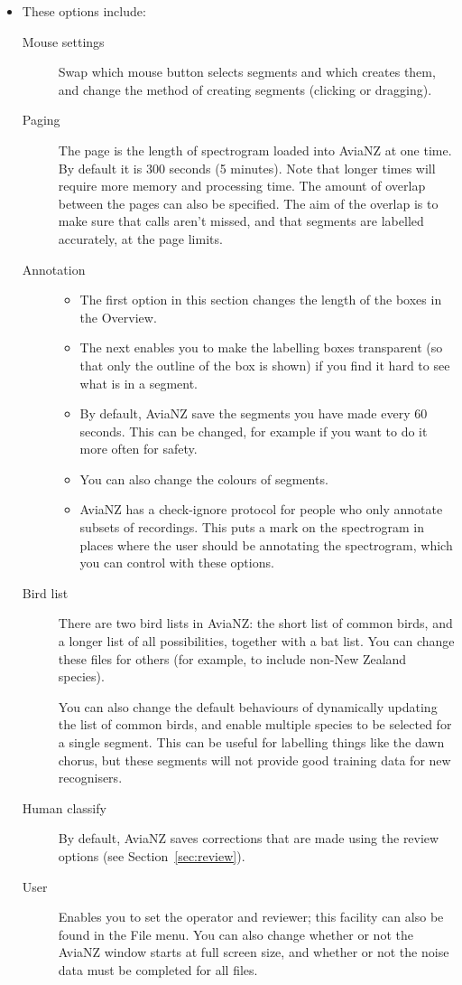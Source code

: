 \documentclass{article}
\begin{document}
\begin{itemize}
\item These options include:
\begin{description}
\item[Mouse settings] Swap which mouse button selects segments and which creates them, and change the method of creating segments (clicking or dragging).
\item[Paging] The page is the length of spectrogram loaded into AviaNZ at one time. By default it is 300 seconds (5 minutes). Note that longer times will require more memory and processing time. The amount of overlap between the pages can also be specified. The aim of the overlap is to make sure that calls aren't missed, and that segments are labelled accurately, at the page limits. 
\item[Annotation] 
\begin{itemize}
\item The first option in this section changes the length of the boxes in the Overview. 
\item The next enables you to make the labelling boxes transparent (so that only the outline of the box is shown) if you find it hard to see what is in a segment. 
\item By default, AviaNZ save the segments you have made every 60 seconds. This can be changed, for example if you want to do it more often for safety. 
\item You can also change the colours of segments.
\item AviaNZ has a check-ignore protocol for people who only annotate subsets of recordings. This puts a mark on the spectrogram in places where the user should be annotating the spectrogram, which you can control with these options.
\end{itemize}
\item[Bird list] There are two bird lists in AviaNZ: the short list of common birds, and a longer list of all possibilities, together with a bat list. You can change these files for others (for example, to include non-New Zealand species). %

You can also change the default behaviours of dynamically updating the list of common birds, and enable multiple species to be selected for a single segment. This can be useful for labelling things like the dawn chorus, but these segments will not provide good training data for new recognisers. 
\item[Human classify] By default, AviaNZ saves corrections that are made using the review options (see Section~\ref{sec:review}). 
\item[User] Enables you to set the operator and reviewer; this facility can also be found in the File menu. You can also change whether or not the AviaNZ window starts at full screen size, and whether or not the noise data must be completed for all files. 
\end{description}
\end{itemize}
\end{document}

